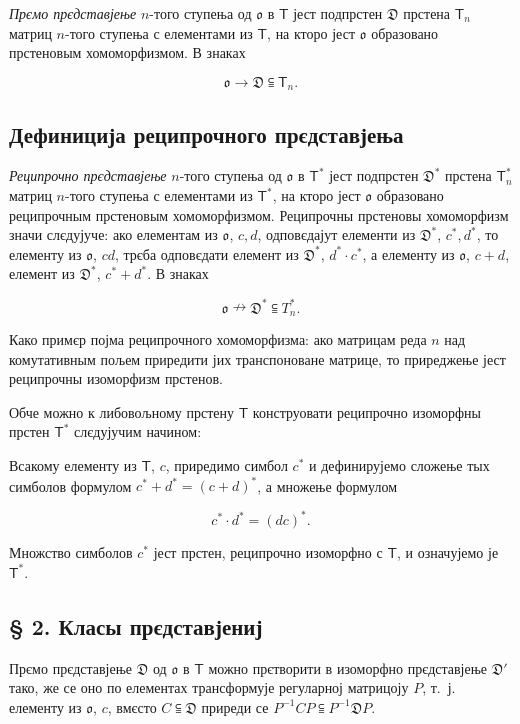 \documentclass[11pt]{article}
\begin{document}
\emph{Прємо прєдставјење} \(n\)-того ступења од \(\mathfrak{o}\) в \(\mathsf T\) јест подпрстен \(\mathfrak D\) прстена \(\mathsf T_n\) матриц \(n\)-того ступења с елементами из \(\mathsf T\), на кторо јест \(\mathfrak{o}\) образовано прстеновым хомоморфизмом. В знаках

\[
\mathfrak{o}\to\mathfrak D\subseteqq\mathsf T_n.
\]

\subsection*{Дефиниција реципрочного прєдставјења}\label{definition-der-reziproken-darstellung}

\emph{Реципрочно прєдставјење} \(n\)-того ступења од \(\mathfrak{o}\) в \(\mathsf T^*\) јест подпрстен \(\mathfrak D^*\) прстена \(\mathsf T_n^*\) матриц \(n\)-того ступења с елементами из \(\mathsf T^*\), на кторо јест \(\mathfrak{o}\) образовано реципрочным прстеновым хомоморфизмом. Реципрочны прстеновы хомоморфизм значи слєдујуче: ако елементам из \(\mathfrak{o}\), \(c,d\), одповєдајут елементи из \(\mathfrak D^*\), \(c^*,d^*\), то елементу из \(\mathfrak{o}\), \(cd\), трєба одповєдати елемент из \(\mathfrak D^*\), \(d^*\cdot c^*\), а елементу из \(\mathfrak{o}\), \(c+d\), елемент из \(\mathfrak D^*\), \(c^*+d^*\). В знаках

\[
\mathfrak{o}\nrightarrow\mathfrak D^*\subseteqq T_n^*.
\]

Како примєр појма реципрочного хомоморфизма: ако матрицам реда \(n\) над комутативным пољем приредити јих транспоноване матрице, то приреджење јест реципрочны изоморфизм прстенов.

Обче можно к либовољному прстену \(\mathsf T\) конструовати реципрочно изоморфны прстен \(\mathsf T^*\) слєдујучим начином:

Всакому елементу из \(\mathsf T\), \(c\), приредимо симбол \(c^*\) и дефинирујемо сложење тых симболов формулом \(c^*+d^*=(c+d)^*\), а множење формулом

\[
c^*\cdot d^*=(dc)^*.
\]

Множство симболов \(c^*\) јест прстен, реципрочно изоморфно с \(\mathsf T\), и означујемо је \(\mathsf T^*\).

\subsection*{§ 2. Класы прєдставјениј}\label{darstellungsklassen}

Прємо прєдставјење \(\mathfrak D\) од \(\mathfrak{o}\) в \(\mathsf T\) можно прєтворити в изоморфно прєдставјење \(\mathfrak D'\) тако, же се оно по елементах трансформује регуларној матрицоју \(P\), т.~ј. елементу из \(\mathfrak{o}\), \(c\), вмєсто \(C\subseteqq\mathfrak D\) приреди се \(P^{-1}CP\subseteqq P^{-1}\mathfrak D P\).
\end{document}
